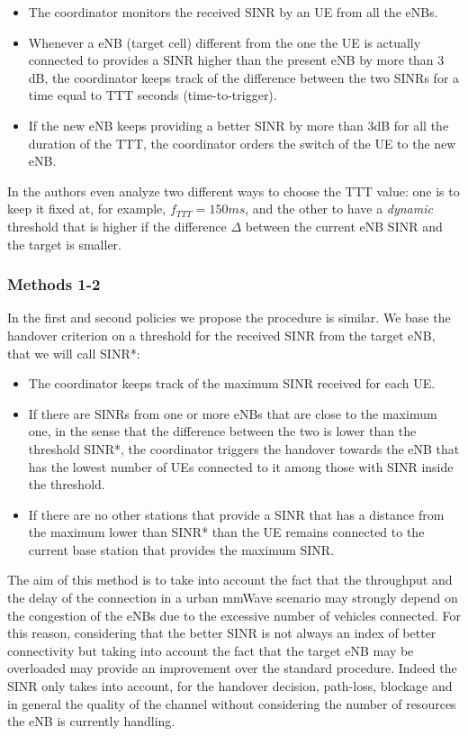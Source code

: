 \documentclass[conference,10pt]{IEEEtran}
\begin{document}
\begin{itemize}
	\item The coordinator monitors the received SINR by an UE from all the eNBs.
	\item Whenever a eNB (target cell) different from the one the UE is actually connected to provides a SINR higher than the present eNB by more than 3 dB, the coordinator keeps track of the difference between the two SINRs for a time equal to TTT seconds (time-to-trigger).
	\item If the new eNB keeps providing a better SINR by more than 3dB for all the duration of the TTT, the coordinator orders the switch of the UE to the new eNB.
\end{itemize}

In \cite{imphand} the authors even analyze two different ways to choose the TTT value: one is to keep it fixed at, for example, $f_{TTT}=150ms$, and the other to have a \emph{dynamic} threshold that is higher if the difference $\Delta$ between the current eNB SINR and the target is smaller. 

\subsubsection{Methods 1-2}
In the first and second policies we propose the procedure is similar. We base the handover criterion on a threshold for the received SINR from the target eNB, that we will call SINR*:

\begin{itemize}
	\item The coordinator keeps track of the maximum SINR received for each UE.
	\item If there are SINRs from one or more eNBs that are close to the maximum one, in the sense that the difference between the two is lower than the threshold SINR*, the coordinator triggers the handover towards the eNB that has the lowest number of UEs connected to it among those with SINR inside the threshold.
	\item If there are no other stations that provide a SINR that has a distance from the maximum lower than SINR* than the UE remains connected to the current base station that provides the maximum SINR.
\end{itemize}

The aim of this method is to take into account the fact that the throughput and the delay of the connection in a urban mmWave scenario may strongly depend on the congestion of the eNBs due to the excessive number of vehicles connected. For this reason, considering that the better SINR is not always an index of better connectivity but taking into account the fact that the target eNB may be overloaded may provide an improvement over the standard procedure. Indeed the SINR only takes into account, for the handover decision, path-loss, blockage and in general the quality of the channel without considering the number of resources the eNB is currently handling.
\end{document}
